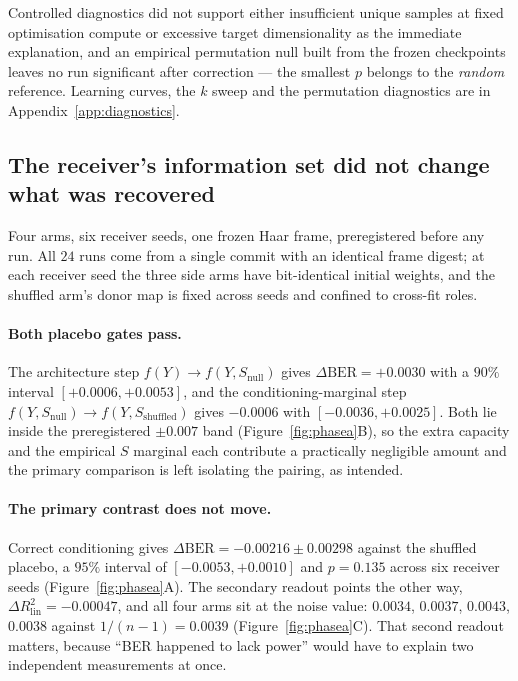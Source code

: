 \documentclass{article}
\theoremstyle{definition}
\begin{document}
Controlled diagnostics did not support either insufficient unique samples at fixed
optimisation compute or excessive target dimensionality as the immediate explanation, and
an empirical permutation null built from the frozen checkpoints leaves no run significant
after correction --- the smallest $p$ belongs to the \emph{random} reference. Learning
curves, the $k$ sweep and the permutation diagnostics are in
Appendix~\ref{app:diagnostics}.

\subsection{The receiver's information set did not change what was recovered}
\label{sec:phasea}

Four arms, six receiver seeds, one frozen Haar frame, preregistered before any run. All
$24$ runs come from a single commit with an identical frame digest; at each receiver seed
the three side arms have bit-identical initial weights, and the shuffled arm's donor map
is fixed across seeds and confined to cross-fit roles.

\paragraph{Both placebo gates pass.}
The architecture step $f(Y)\to f(Y,S_{\mathrm{null}})$ gives $\Delta\mathrm{BER}=+0.0030$
with a $90\%$ interval $[+0.0006,+0.0053]$, and the conditioning-marginal step
$f(Y,S_{\mathrm{null}})\to f(Y,S_{\mathrm{shuffled}})$ gives $-0.0006$ with
$[-0.0036,+0.0025]$. Both lie inside the preregistered $\pm0.007$ band
(Figure~\ref{fig:phasea}B), so the extra capacity and the empirical $S$ marginal each
contribute a practically negligible amount and the primary comparison is left isolating
the pairing, as intended.

\paragraph{The primary contrast does not move.}
Correct conditioning gives $\Delta\mathrm{BER}=-0.00216\pm0.00298$ against the shuffled
placebo, a $95\%$ interval of $[-0.0053,+0.0010]$ and $p=0.135$ across six receiver seeds
(Figure~\ref{fig:phasea}A). The secondary readout points the other way,
$\Delta R^2_{\mathrm{lin}}=-0.00047$, and all four arms sit at the noise value: $0.0034$,
$0.0037$, $0.0043$, $0.0038$ against $1/(n-1)=0.0039$ (Figure~\ref{fig:phasea}C). That
second readout matters, because ``BER happened to lack power'' would have to explain two
independent measurements at once.
\end{document}
